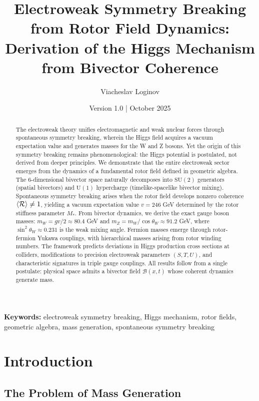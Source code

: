\documentclass[11pt,a4paper]{article}
\title{\textbf{Electroweak Symmetry Breaking from Rotor Field Dynamics: \\
Derivation of the Higgs Mechanism from Bivector Coherence}}
\author[1]{Viacheslav Loginov}
\affil[1]{Kyiv, Ukraine\\ \texttt{barthez.slavik@gmail.com}}
\date{\small Version 1.0 \quad|\quad 15 October 2025}
\newcommand{\Rotor}{\mathcal{R}}
\newcommand{\Biv}{\mathcal{B}}
\newcommand{\SU}{\mathrm{SU}}
\newcommand{\U}{\mathrm{U}}
\theoremstyle{definition}
\theoremstyle{plain}
\theoremstyle{remark}
\begin{document}
\maketitle

\begin{abstract}
\noindent
The electroweak theory unifies electromagnetic and weak nuclear forces through spontaneous symmetry breaking, wherein the Higgs field acquires a vacuum expectation value and generates masses for the W and Z bosons. Yet the origin of this symmetry breaking remains phenomenological: the Higgs potential is postulated, not derived from deeper principles. We demonstrate that the entire electroweak sector emerges from the dynamics of a fundamental rotor field defined in geometric algebra. The 6-dimensional bivector space naturally decomposes into $\SU(2)$ generators (spatial bivectors) and $\U(1)$ hypercharge (timelike-spacelike bivector mixing). Spontaneous symmetry breaking arises when the rotor field develops nonzero coherence $\ev{\Rotor} \neq 1$, yielding a vacuum expectation value $v = 246$ GeV determined by the rotor stiffness parameter $M_\ast$. From bivector dynamics, we derive the exact gauge boson masses: $m_W = gv/2 \approx 80.4$ GeV and $m_Z = m_W/\cos\theta_W \approx 91.2$ GeV, where $\sin^2\theta_W \approx 0.231$ is the weak mixing angle. Fermion masses emerge through rotor-fermion Yukawa couplings, with hierarchical masses arising from rotor winding numbers. The framework predicts deviations in Higgs production cross sections at colliders, modifications to precision electroweak parameters $(S,T,U)$, and characteristic signatures in triple gauge couplings. All results follow from a single postulate: physical space admits a bivector field $\Biv(x,t)$ whose coherent dynamics generate mass.
\end{abstract}

\noindent\textbf{Keywords:} electroweak symmetry breaking, Higgs mechanism, rotor fields, geometric algebra, mass generation, spontaneous symmetry breaking

\vspace{1em}

\section{Introduction}

\subsection{The Problem of Mass Generation}
\end{document}
